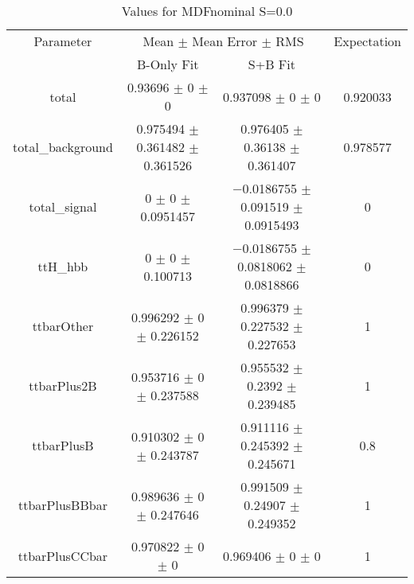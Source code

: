 \begin{table}
\centering
\caption{Values for MDFnominal S=0.0}
\begin{tabular}{cccc}
\toprule
Parameter & \multicolumn{2}{c}{Mean $\pm$ Mean Error $\pm$ RMS} & Expectation\\
 & B-Only Fit & S+B Fit & \\
\midrule
total & \num{0.93696} $\pm$ \num{0} $\pm$ \num{0} & \num{0.937098} $\pm$ \num{0} $\pm$ \num{0} & \num{0.920033}\\
total\_background & \num{0.975494} $\pm$ \num{0.361482} $\pm$ \num{0.361526} & \num{0.976405} $\pm$ \num{0.36138} $\pm$ \num{0.361407} & \num{0.978577}\\
total\_signal & \num{0} $\pm$ \num{0} $\pm$ \num{0.0951457} & \num{-0.0186755} $\pm$ \num{0.091519} $\pm$ \num{0.0915493} & \num{0}\\
ttH\_hbb & \num{0} $\pm$ \num{0} $\pm$ \num{0.100713} & \num{-0.0186755} $\pm$ \num{0.0818062} $\pm$ \num{0.0818866} & \num{0}\\
ttbarOther & \num{0.996292} $\pm$ \num{0} $\pm$ \num{0.226152} & \num{0.996379} $\pm$ \num{0.227532} $\pm$ \num{0.227653} & \num{1}\\
ttbarPlus2B & \num{0.953716} $\pm$ \num{0} $\pm$ \num{0.237588} & \num{0.955532} $\pm$ \num{0.2392} $\pm$ \num{0.239485} & \num{1}\\
ttbarPlusB & \num{0.910302} $\pm$ \num{0} $\pm$ \num{0.243787} & \num{0.911116} $\pm$ \num{0.245392} $\pm$ \num{0.245671} & \num{0.8}\\
ttbarPlusBBbar & \num{0.989636} $\pm$ \num{0} $\pm$ \num{0.247646} & \num{0.991509} $\pm$ \num{0.24907} $\pm$ \num{0.249352} & \num{1}\\
ttbarPlusCCbar & \num{0.970822} $\pm$ \num{0} $\pm$ \num{0} & \num{0.969406} $\pm$ \num{0} $\pm$ \num{0} & \num{1}\\
\bottomrule
\end{tabular}
\end{table}